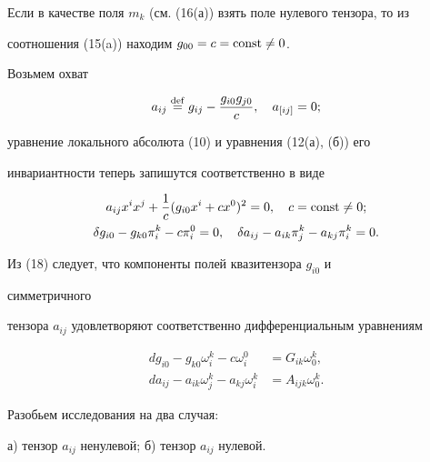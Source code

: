 Если в качестве поля $m_k$ (см. (16(а)) взять поле нулевого тензора, то из 


соотношения (15(a)) находим $g_{00}=c=\operatorname{const}\ne0$. 


 


Возьмем охват 


$$ 


a_{ij}\defeq g_{ij}-\frac{g_{i0}g_{j0}}{c},\quad 


a_{[ij]}=0; 


$$ 


уравнение локального абсолюта (10) и уравнения (12(а), (б)) его 


инвариантности теперь запишутся соответственно в виде 


\begin{gather} 


a_{ij}x^i x^j+\frac{1}{c}(g_{i0}x^i+c x^0)^2=0,\quad 


c=\const\ne0;\\ 


\delta g_{i0}-g_{k0}\pi^k_i-c\pi^0_i=0,\quad 


\delta a_{ij}-a_{ik}\pi^k_j-a_{kj}\pi^k_i=0. 


\end{gather} 


Из (18) следует, что компоненты полей квазитензора $g_{i0}$ и 


симметричного 


тензора $a_{ij}$ удовлетворяют соответственно дифференциальным уравнениям 


\begin{align} 


dg_{i0}-g_{k0}\omega^k_i-c\omega^0_i&=G_{ik}\omega^k_0,\\ 


d a_{ij}-a_{ik}\omega^k_j-a_{kj}\omega^k_i&= 


A_{ijk}\omega^k_0. 


\end{align} 


 


 


Разобьем исследования на два случая: 


 


а) тензор $a_{ij}$ ненулевой; б) тензор $a_{ij}$ нулевой. 


 


